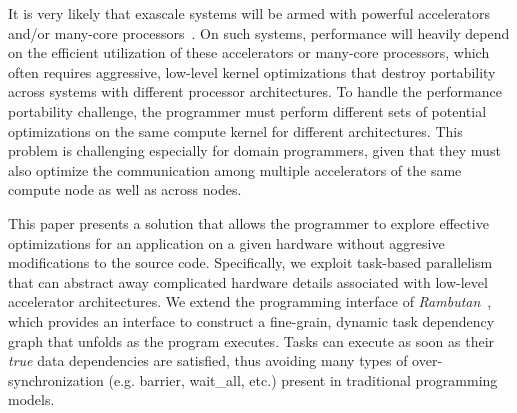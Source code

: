 It is very likely that exascale systems will be armed with powerful accelerators and/or many-core processors~\cite{ASCR/Exascale/Lethin, exascaleRoadMap}.
On such systems, performance will heavily depend on the efficient utilization of these accelerators or many-core processors, which often requires aggressive, low-level kernel optimizations that destroy portability across systems with different processor architectures.
To handle the performance portability challenge, the programmer must perform different sets of potential optimizations on the same compute kernel for different architectures.
This problem is challenging especially for domain programmers, given that they must also optimize the communication among multiple accelerators of the same compute node as well as across nodes.

This paper presents a solution that allows the programmer to explore effective optimizations for an application on a given hardware without aggresive modifications to the source code. 
Specifically, we exploit task-based parallelism that can abstract away complicated hardware details associated with low-level accelerator architectures.
We extend the programming interface of {\em Rambutan}~\cite{rambutanWebsite}, which provides an interface to construct a fine-grain, dynamic task dependency graph that unfolds as the program executes. 
Tasks can execute as soon as their {\em true} data dependencies are satisfied, thus avoiding many types of over-synchronization (e.g. barrier, wait\_all, etc.) present in traditional programming models.

